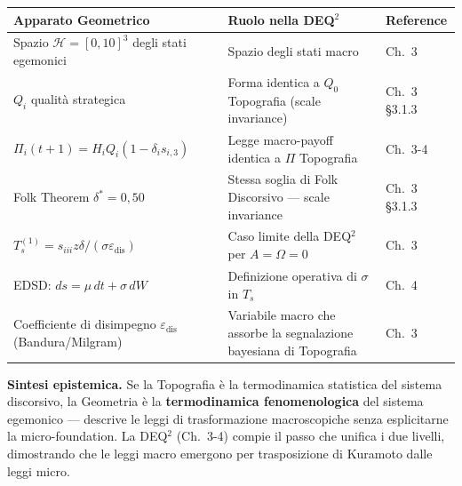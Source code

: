 {\def\LTcaptype{none} %
{\small\begin{longtable}[]{@{}
  >{\raggedright\arraybackslash}p{}
  >{\raggedright\arraybackslash}p{}
  >{\raggedright\arraybackslash}p{}@{}}
\toprule\noalign{}
\begin{minipage}[b]{\linewidth}\raggedright
Apparato Geometrico
\end{minipage} & \begin{minipage}[b]{\linewidth}\raggedright
Ruolo nella DEQ$^2$
\end{minipage} & \begin{minipage}[b]{\linewidth}\raggedright
Reference
\end{minipage} \\
\midrule\noalign{}
\endhead
\bottomrule\noalign{}
\endlastfoot
Spazio \(\mathcal{H} = [0,10]^3\) degli stati egemonici & Spazio degli
stati macro & Ch.~3 \\
\(Q_i\) qualità strategica & Forma identica a \(Q_0\) Topografia
(scale invariance) & Ch.~3 \S{}3.1.3 \\
\(\Pi_i(t+1) = H_i Q_i (1 - \delta_i s_{i,3})\) & Legge macro-payoff
identica a $\Pi$ Topografia & Ch.~3-4 \\
Folk Theorem \(\delta^* = 0{,}50\) & Stessa soglia di Folk Discorsivo
--- scale invariance & Ch.~3 \S{}3.1.3 \\
\(T_s^{(1)} = s_{iii} z \delta / (\sigma \varepsilon_{\text{dis}})\) &
Caso limite della DEQ$^2$ per \(A = \Omega = 0\) & Ch.~3 \\
EDSD: \(ds = \mu\, dt + \sigma\, dW\) & Definizione operativa di
\(\sigma\) in \(T_s\) & Ch.~4 \\
Coefficiente di disimpegno \(\varepsilon_{\text{dis}}\)
(Bandura/Milgram) & Variabile macro che assorbe la segnalazione
bayesiana di Topografia & Ch.~3 \\
\end{longtable}}
}

\Hypoth{} \textbf{Sintesi epistemica.} Se la Topografia è la
termodinamica statistica del sistema discorsivo, la Geometria è la
\textbf{termodinamica fenomenologica} del sistema egemonico --- descrive
le leggi di trasformazione macroscopiche senza esplicitarne la
micro-foundation. La DEQ$^2$ (Ch.~3-4) compie il passo che unifica i due
livelli, dimostrando che le leggi macro emergono per trasposizione di
Kuramoto dalle leggi micro.



